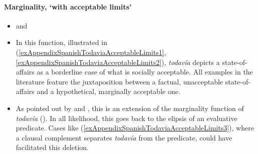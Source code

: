 \paragraph{Marginality, \lq with acceptable limits'}
\label{appendixSpanishTodaviaAcceptableLimits}
\begin{itemize}
	\item \textcite{Bosque2016} and \textcite{Deloor2012}
	\item In this function, illustrated in (\ref{exAppendixSpanishTodaviaAcceptableLimits1}, \ref{exAppendixSpanishTodaviaAcceptableLimits2}), \textit{todavía} depicts a state-of-affairs as a borderline case of what is socially acceptable. All examples in the literature feature the juxtaposition between a factual, unacceptable state-of-affairs and a hypothetical, marginally acceptable one.
	\item As pointed out by \textcite{Bosque2016} and \textcite{Deloor2012}, this is an extension of the marginality function of \textit{todavía} (). In all likelihood, this goes back to the elipsis of an evaluative predicate. Cases like (\ref{exAppendixSpanishTodaviaAcceptableLimits3}), where a clausal complement separates \textit{todavía} from the predicate, could have facilitated this deletion.
\end{itemize}

